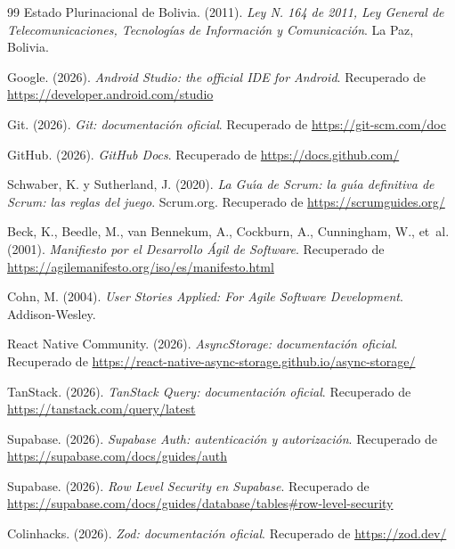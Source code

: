 \documentclass[12pt,letterpaper]{article}
\begin{document}
\begin{thebibliography}{99}
Estado Plurinacional de Bolivia. (2011). \textit{Ley N.{\textordmasculine} 164 de 2011, Ley General de Telecomunicaciones, Tecnolog\'ias de Informaci\'on y Comunicaci\'on}. La Paz, Bolivia.

Google. (2026). \textit{Android Studio: the official IDE for Android}. Recuperado de \url{https://developer.android.com/studio}

Git. (2026). \textit{Git: documentaci\'on oficial}. Recuperado de \url{https://git-scm.com/doc}

GitHub. (2026). \textit{GitHub Docs}. Recuperado de \url{https://docs.github.com/}

Schwaber, K. y Sutherland, J. (2020). \textit{La Gu{\'\i}a de Scrum: la gu{\'\i}a definitiva de Scrum: las reglas del juego}. Scrum.org. Recuperado de \url{https://scrumguides.org/}

Beck, K., Beedle, M., van Bennekum, A., Cockburn, A., Cunningham, W., et~al. (2001). \textit{Manifiesto por el Desarrollo {\'A}gil de Software}. Recuperado de \url{https://agilemanifesto.org/iso/es/manifesto.html}

Cohn, M. (2004). \textit{User Stories Applied: For Agile Software Development}. Addison-Wesley.

React Native Community. (2026). \textit{AsyncStorage: documentaci\'on oficial}. Recuperado de \url{https://react-native-async-storage.github.io/async-storage/}

TanStack. (2026). \textit{TanStack Query: documentaci\'on oficial}. Recuperado de \url{https://tanstack.com/query/latest}

Supabase. (2026). \textit{Supabase Auth: autenticaci\'on y autorizaci\'on}. Recuperado de \url{https://supabase.com/docs/guides/auth}

Supabase. (2026). \textit{Row Level Security en Supabase}. Recuperado de \url{https://supabase.com/docs/guides/database/tables#row-level-security}

Colinhacks. (2026). \textit{Zod: documentaci\'on oficial}. Recuperado de \url{https://zod.dev/}

\end{thebibliography}
\end{document}
